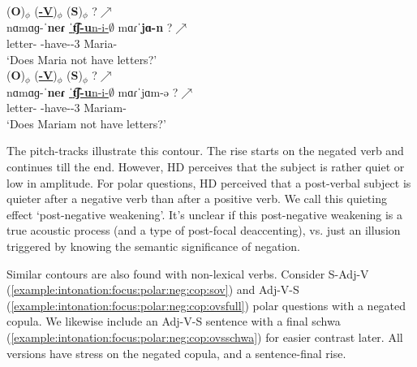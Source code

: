 \begin{exe}
	\ex\label{example:intonation:focus:polar:neg:ovs} \begin{xlist}
		\ex \glll   (\textbf{O})$_\phi$ (\underline{\textbf{{\neggloss}-V}})$_\phi$ (\textbf{S})$_\phi$  ?$\nearrow$ \\
		{nɑmɑɡ-ˈ\textbf{neɾ}} \underline{ˈ\textbf{t͡ʃ-u}n-i-$\emptyset$} mɑɾˈ\textbf{jɑ-n}   ?$\nearrow$ \\
		letter-{\pl} {\neggloss}-have-{\thgloss}-3{\sg}   Maria-{}  \\
		\trans `Does Maria  not have letters?' 
		\\ 
		\ex \glll   (\textbf{O})$_\phi$ (\underline{\textbf{{\neggloss}-V}})$_\phi$ (\textbf{S})$_\phi$  ?$\nearrow$ \\
		{nɑmɑɡ-ˈ\textbf{neɾ}} \underline{ˈ\textbf{t͡ʃ-u}n-i-$\emptyset$} mɑɾˈ{jɑ}m-ə   ?$\nearrow$ \\
		letter-{\pl} {\neggloss}-have-{\thgloss}-3{\sg}   Mariam-{}  \\
		\trans `Does Mariam  not have letters?' 
		\\ 
		
	\end{xlist}
\end{exe}


The pitch-tracks illustrate this contour. The rise starts on the negated verb and continues till the end. However, HD perceives that the subject is rather quiet or low in amplitude.  For polar questions, HD perceived that a post-verbal subject is quieter after a negative verb than after a positive verb.  We call this quieting effect `post-negative weakening'.   It's unclear if this post-negative weakening is a true acoustic process (and a type of post-focal deaccenting), vs. just an illusion triggered by knowing the semantic significance of negation. 

Similar contours are    also found with non-lexical verbs.  Consider S-Adj-V (\ref{example:intonation:focus:polar:neg:cop:sov}) and Adj-V-S (\ref{example:intonation:focus:polar:neg:cop:ovsfull}) polar questions with a negated copula. We likewise include an Adj-V-S  sentence with a final schwa (\ref{example:intonation:focus:polar:neg:cop:ovsschwa})  for easier contrast later.    All  versions have stress on the negated copula, and a sentence-final rise. 

